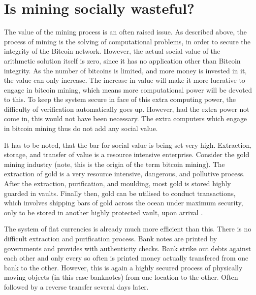 
\chapter{Is mining socially wasteful?}

The value of the mining process is an often raised issue. As described
above, the process of mining is the solving of computational problems,
in order to secure the integrity of the Bitcoin network. However,
the actual social value of the arithmetic solution itself is zero,
since it has no application other than Bitcoin integrity. As the number
of bitcoins is limited, and more money is invested in it, the value
can only increase. The increase in value will make it more lucrative
to engage in bitcoin mining, which means more computational power
will be devoted to this. To keep the system secure in face of this
extra computing power, the difficulty of verification automatically
goes up. However, had the extra power not come in, this would not
have been necessary. The extra computers which engage in bitcoin mining
thus do not add any social value.

It has to be noted, that the bar for social value is being set very
high. Extraction, storage, and transfer of value is a resource intensive
enterprise. Consider the gold mining industry (note, this is the origin
of the term bitcoin mining). The extraction of gold is a very resource
intensive, dangerous, and pollutive process. After the extraction,
purification, and moulding, most gold is stored highly guarded in
vaults. Finally then, gold can be utilised to conduct transactions,
which involves shipping bars of gold across the ocean under maximum
security, only to be stored in another highly protected vault, upon
arrival \citep[see e.g.][]{friedman2008monetary}.

The system of fiat currencies is already much more efficient than
this. There is no difficult extraction and purification process. Bank
notes are printed by governments and provides with authenticity checks.
Bank strike out debts against each other and only every so often is
printed money actually transfered from one bank to the other. However,
this is again a highly secured process of physically moving objects
(in this case banknotes) from one location to the other. Often followed
by a reverse transfer several days later.


